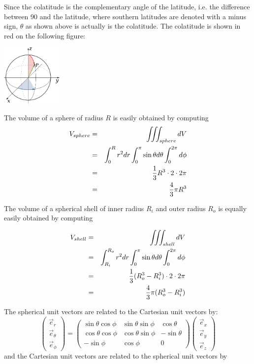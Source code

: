 Since the colatitude is the complementary angle of the latitude, 
i.e. the difference between 90 and the latitude, 
where southern latitudes are denoted with a minus sign,
$\theta$ as shown above is actually is the colatitude.
The colatitude is shown in red on the following figure: 
\begin{center}
\includegraphics[width=3cm]{images/colatitude}
\end{center}

The volume of a sphere of radius $R$ is easily obtained by computing 
\begin{eqnarray}
V_{sphere} 
&=& \iiint_{sphere} dV \nonumber\\
&=& \int_0^R r^2 dr \int_0^\pi \sin\theta d\theta \int_0^{2\pi} d\phi  \nonumber\\
&=& \frac{1}{3}R^3  \cdot 2 \cdot 2\pi \nonumber\\
&=& \frac{4}{3}\pi R^3 
\end{eqnarray}

The volume of a spherical shell of inner radius $R_i$ and outer radius $R_o$
is equally easily obtained by computing 

\begin{eqnarray}
V_{shell}
&=& \iiint_{shell} dV \nonumber\\
&=& \int_{R_i}^{R_o} r^2 dr \int_0^\pi \sin\theta d\theta \int_0^{2\pi} d\phi  \nonumber\\
&=& \frac{1}{3}(R_o^3-R_i^3)  \cdot 2 \cdot 2\pi \nonumber\\
&=& \frac{4}{3}\pi (R^3_o -R^3_i)
\end{eqnarray}


\noindent The spherical unit vectors are related to the Cartesian unit vectors by:
\[
\left(
\begin{array}{c}
\vec{e}_{r} \\ \vec{e}_\theta \\ \vec{e}_\phi
\end{array}
\right)
=
\left(
\begin{array}{ccc}
\sin\theta \cos\phi & \sin\theta\sin\phi & \cos\theta  \\
\cos\theta \cos\phi & \cos\theta\sin\phi & -\sin\theta \\
-\sin\phi & \cos\phi & 0
\end{array}
\right)
\left(
\begin{array}{c}
\vec{e}_{x} \\ \vec{e}_y \\ \vec{e}_z
\end{array}
\right)
\]
and the Cartesian unit vectors are related to the spherical unit vectors by

